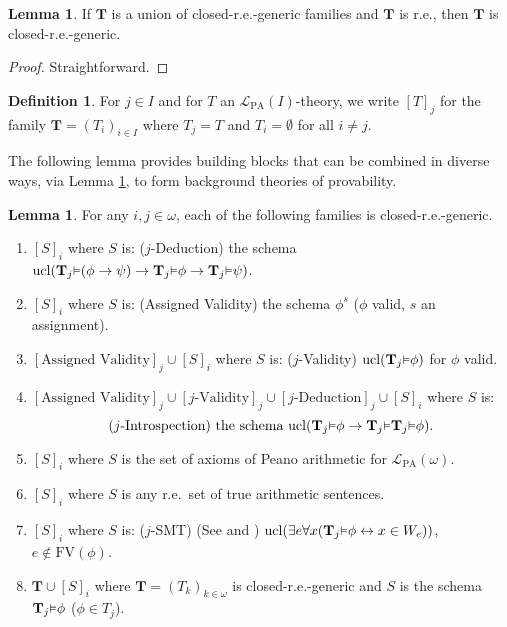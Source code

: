 \documentclass[reqno]{article}
\theoremstyle{definition}
\newtheorem{lemma}[theorem]{Lemma}
\newtheorem{definition}[theorem]{Definition}
\def\L{\mathscr{L}}
\def\T{\mathbf{T}}
\def\FV{\mathrm{FV}}
\def\LPA{\L_{\mathrm{PA}}}
\renewcommand{\Pr}[1]{\T_{#1}\mbox{\small${\vDash}$}}
\newcommand{\ucl}[1]{\mathrm{ucl}(#1)}
\begin{document}
\begin{lemma}
\label{genericclosedreunion}
If $\T$ is a union of closed-r.e.-generic families
and $\T$ is r.e., then $\T$ is closed-r.e.-generic.
\end{lemma}

\begin{proof}
Straightforward.
\end{proof}

\begin{definition}
For $j\in I$ and for $T$ an $\LPA(I)$-theory,
we write $[T]_j$ for the family $\T=(T_i)_{i\in I}$
where $T_j=T$ and $T_i=\emptyset$ for all $i\not=j$.
\end{definition}


The following lemma provides building blocks
that can be combined in diverse ways, via Lemma \ref{genericclosedreunion}, to
form background theories of provability.


\begin{lemma}
\label{firstgrabbag}
For any $i,j\in \omega$,
each of the following families is closed-r.e.-generic.
\begin{enumerate}
\item $[S]_i$ where $S$ is: ($j$-Deduction) the schema $\ucl{\Pr 
j(\phi\rightarrow\psi)\rightarrow \Pr j\phi\rightarrow \Pr j\psi}$.
\item $[S]_i$ where $S$ is: (Assigned Validity) the schema $\phi^s$ ($\phi$ valid, $s$ an assignment).
\item $[\mbox{Assigned Validity}]_j\cup[S]_i$ where $S$ is: ($j$-Validity) $\ucl{\Pr j\phi}$ for $\phi$ valid.
\item $[\mbox{Assigned Validity}]_j\cup[\mbox{$j$-Validity}]_j\cup [\mbox{$j$-Deduction}]_j\cup [S]_i$ where $S$ is:
\[\mbox{($j$-Introspection) the schema $\ucl{\Pr j\phi\rightarrow\Pr j\Pr j\phi}$.}\]
\item $[S]_i$ where $S$ is the set of axioms of Peano arithmetic for $\LPA(\omega)$.
\item $[S]_i$ where $S$ is any r.e.~set of true arithmetic sentences.
\item $[S]_i$ where $S$ is: ($j$-SMT) (See \cite{carlson2000} and \cite{reinhardt}) $\ucl{\exists e\forall x(\Pr 
j\phi\leftrightarrow x\in W_e)}$, $e\not\in\FV(\phi)$.
\item $\T\cup [S]_i$ where $\T=(T_k)_{k\in\omega}$ is closed-r.e.-generic and $S$ is the schema $\Pr j\phi$ ($\phi\in T_j$).
\end{enumerate}
\end{lemma}
\end{document}
